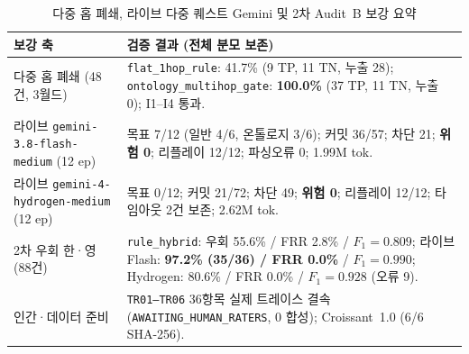 \begin{table}[!tbp]
\caption{다중 홉 폐쇄, 라이브 다중 퀘스트 Gemini 및 2차 Audit~B 보강 요약}
\label{tab:green-venue-compact}
\centering
\scriptsize
\begin{tabularx}{\columnwidth}{@{}>{\raggedright\arraybackslash}p{}>{\raggedright\arraybackslash}X@{}}
\toprule
\textbf{보강 축} & \textbf{검증 결과 (전체 분모 보존)} \\
\midrule
다중 홉 폐쇄 (48건, 3월드) & \texttt{flat\_}\allowbreak\texttt{1hop\_}\allowbreak\texttt{rule}: 41.7\% (9 TP, 11 TN, 누출 28); \texttt{ontology\_}\allowbreak\texttt{multihop\_}\allowbreak\texttt{gate}: \textbf{100.0\%} (37 TP, 11 TN, 누출 0); I1--I4 통과. \\
라이브 \texttt{gemini-3.8-}\allowbreak\texttt{flash-}\allowbreak\texttt{medium} (12 ep) & 목표 7/12 (일반 4/6, 온톨로지 3/6); 커밋 36/57; 차단 21; \textbf{위험 0}; 리플레이 12/12; 파싱오류 0; 1.99M tok. \\
라이브 \texttt{gemini-4-}\allowbreak\texttt{hydrogen-}\allowbreak\texttt{medium} (12 ep) & 목표 0/12; 커밋 21/72; 차단 49; \textbf{위험 0}; 리플레이 12/12; 타임아웃 2건 보존; 2.62M tok. \\
2차 우회 한·영 (88건) & \texttt{rule\_hybrid}: 우회 55.6\% / FRR 2.8\% / $F_1{=}0.809$; 라이브 Flash: \textbf{97.2\% (35/36) / FRR 0.0\%} / $F_1{=}0.990$; Hydrogen: 80.6\% / FRR 0.0\% / $F_1{=}0.928$ (오류 9). \\
인간·데이터 준비 & \texttt{TR01--TR06} 36항목 실제 트레이스 결속 (\texttt{AWAITING\_}\allowbreak\texttt{HUMAN\_}\allowbreak\texttt{RATERS}, 0 합성); Croissant~1.0 (6/6 SHA-256). \\
\bottomrule
\end{tabularx}
\end{table}
